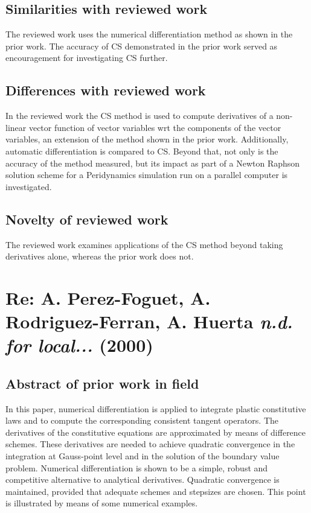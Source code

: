 \documentclass[10pt,letterpaper,draft]{article}
\begin{document}
\subsection{Similarities with reviewed work}

The reviewed work uses the numerical differentiation method as shown in the
prior work. The accuracy of CS demonstrated in the prior work served as encouragement
for investigating CS further.

\subsection{Differences with reviewed work}

In the reviewed work the CS method is used to compute derivatives of a
non-linear vector function of vector variables wrt the components of the vector
variables, an extension of the method shown in the prior work.
Additionally, automatic differentiation is compared to CS. Beyond that, not
only is the accuracy of the method measured, but its impact as part of a Newton
Raphson solution scheme for a Peridynamics simulation run on a parallel
computer is investigated.

\subsection{Novelty of reviewed work}
The reviewed work examines applications of the CS method beyond taking derivatives alone,
whereas the prior work does not. 

\section{Re: A. Perez-Foguet, A. Rodriguez-Ferran, A. Huerta \emph{n.d. for local...} (2000)}
\subsection{Abstract of prior work in field}

In this paper, numerical differentiation is applied to integrate plastic
constitutive laws and to compute the corresponding consistent tangent
operators. The derivatives of the constitutive equations are approximated by
means of difference schemes. These derivatives are needed to achieve quadratic
convergence in the integration at Gauss-point level and in the solution of the
boundary value problem.  Numerical differentiation is shown to be a simple,
robust and competitive alternative to analytical derivatives. Quadratic
convergence is maintained, provided that adequate schemes and stepsizes are
chosen. This point is illustrated by means of some numerical examples.
\end{document}
